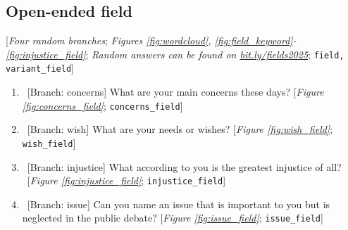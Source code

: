 \begin{enumerate}[resume]


\end{enumerate} 

 \subsection*{Open-ended field} 
 [\textit{Four random branches}; \textit{Figures \ref{fig:wordcloud}, \ref{fig:field_keyword}-\ref{fig:injustice_field}}; \textit{Random answers can be found on \href{http://preferences-pol.fr/fields2025.html}{bit.ly/fields2025}}; 
 \verb|field, variant_field|] 
 \begin{enumerate}[resume] 
\item  \label{q:concerns_field} ~[Branch: concerns] What are your main concerns these days? [\textit{Figure \ref{fig:concerns_field}}; 
\verb|concerns_field|]


\item  \label{q:wish_field} ~[Branch: wish] What are your needs or wishes? [\textit{Figure \ref{fig:wish_field}}; 
\verb|wish_field|]


\item  \label{q:injustice_field} ~[Branch: injustice] What according to you is the greatest injustice of all?\\ 
~[\textit{Figure \ref{fig:injustice_field}}; 
\verb|injustice_field|]


\item  \label{q:issue_field} ~[Branch: issue] Can you name an issue that is important to you but is neglected in the public debate? [\textit{Figure \ref{fig:issue_field}}; 
\verb|issue_field|]


\end{enumerate} 

